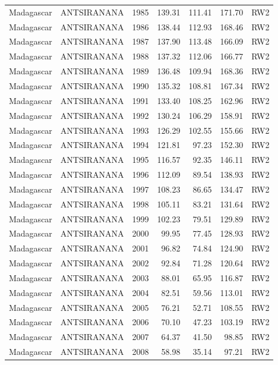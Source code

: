 \begin{longtable}{lllrrrl}
  Madagascar & ANTSIRANANA & 1985 & 139.31 & 111.41 & 171.70 & RW2 \\ 
  Madagascar & ANTSIRANANA & 1986 & 138.44 & 112.93 & 168.46 & RW2 \\ 
  Madagascar & ANTSIRANANA & 1987 & 137.90 & 113.48 & 166.09 & RW2 \\ 
  Madagascar & ANTSIRANANA & 1988 & 137.32 & 112.06 & 166.77 & RW2 \\ 
  Madagascar & ANTSIRANANA & 1989 & 136.48 & 109.94 & 168.36 & RW2 \\ 
  Madagascar & ANTSIRANANA & 1990 & 135.32 & 108.81 & 167.34 & RW2 \\ 
  Madagascar & ANTSIRANANA & 1991 & 133.40 & 108.25 & 162.96 & RW2 \\ 
  Madagascar & ANTSIRANANA & 1992 & 130.24 & 106.29 & 158.91 & RW2 \\ 
  Madagascar & ANTSIRANANA & 1993 & 126.29 & 102.55 & 155.66 & RW2 \\ 
  Madagascar & ANTSIRANANA & 1994 & 121.81 & 97.23 & 152.30 & RW2 \\ 
  Madagascar & ANTSIRANANA & 1995 & 116.57 & 92.35 & 146.11 & RW2 \\ 
  Madagascar & ANTSIRANANA & 1996 & 112.09 & 89.54 & 138.93 & RW2 \\ 
  Madagascar & ANTSIRANANA & 1997 & 108.23 & 86.65 & 134.47 & RW2 \\ 
  Madagascar & ANTSIRANANA & 1998 & 105.11 & 83.21 & 131.64 & RW2 \\ 
  Madagascar & ANTSIRANANA & 1999 & 102.23 & 79.51 & 129.89 & RW2 \\ 
  Madagascar & ANTSIRANANA & 2000 & 99.95 & 77.45 & 128.93 & RW2 \\ 
  Madagascar & ANTSIRANANA & 2001 & 96.82 & 74.84 & 124.90 & RW2 \\ 
  Madagascar & ANTSIRANANA & 2002 & 92.84 & 71.28 & 120.64 & RW2 \\ 
  Madagascar & ANTSIRANANA & 2003 & 88.01 & 65.95 & 116.87 & RW2 \\ 
  Madagascar & ANTSIRANANA & 2004 & 82.51 & 59.56 & 113.01 & RW2 \\ 
  Madagascar & ANTSIRANANA & 2005 & 76.21 & 52.71 & 108.55 & RW2 \\ 
  Madagascar & ANTSIRANANA & 2006 & 70.10 & 47.23 & 103.19 & RW2 \\ 
  Madagascar & ANTSIRANANA & 2007 & 64.37 & 41.50 & 98.85 & RW2 \\ 
  Madagascar & ANTSIRANANA & 2008 & 58.98 & 35.14 & 97.21 & RW2 \\ 

\end{longtable}

